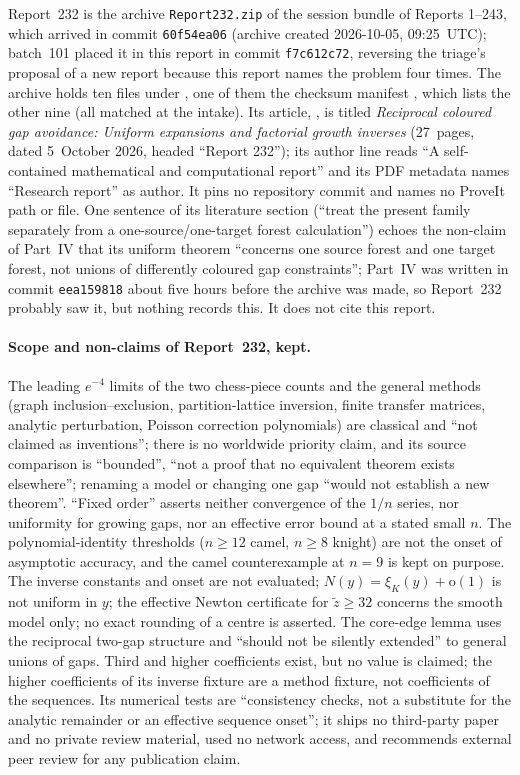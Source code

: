 \documentclass[11pt]{article}
\numberwithin{equation}{section}
\theoremstyle{definition}
\theoremstyle{remark}
\theoremstyle{definition}
\newcommand{\smallo}{\mathrm o}
\begin{document}
Report~232 is the archive \nolinkurl{Report232.zip} of the session bundle of
Reports 1--243, which arrived in commit \texttt{60f54ea06} (archive created
2026-10-05, 09:25~UTC); batch~101 placed it in this report in commit
\texttt{f7c612c72}, reversing the triage's proposal of a new report because
this report names the problem four times. The archive holds ten files under
, one of them the checksum manifest , which
lists the other nine (all matched at the intake). Its article,
, is titled \emph{Reciprocal coloured gap avoidance: Uniform
expansions and factorial growth inverses} (27~pages, dated 5~October 2026,
headed ``Report 232''); its author line reads ``A self-contained mathematical
and computational report'' and its PDF metadata names ``Research report'' as
author. It pins no repository commit and names no ProveIt path or file. One
sentence of its literature section (``treat the present family separately
from a one-source/one-target forest calculation'') echoes the non-claim of
Part~IV that its uniform theorem ``concerns one source forest and one target
forest, not unions of differently coloured gap constraints''; Part~IV was
written in commit \texttt{eea159818} about five hours before the archive was
made, so Report~232 probably saw it, but nothing records this. It does not
cite this report.

\paragraph{Scope and non-claims of Report~232, kept.}
The leading $e^{-4}$ limits of the two chess-piece counts and the general
methods (graph inclusion--exclusion, partition-lattice inversion, finite
transfer matrices, analytic perturbation, Poisson correction polynomials)
are classical and ``not claimed as inventions''; there is no worldwide
priority claim, and its source comparison is ``bounded'', ``not a proof that
no equivalent theorem exists elsewhere''; renaming a model or changing one
gap ``would not establish a new theorem''. ``Fixed order'' asserts neither
convergence of the $1/n$ series, nor uniformity for growing gaps, nor an
effective error bound at a stated small $n$. The polynomial-identity
thresholds ($n\ge12$ camel, $n\ge8$ knight) are not the onset of asymptotic
accuracy, and the camel counterexample at $n=9$ is kept on purpose. The
inverse constants and onset are not evaluated; $N(y)=\xi_K(y)+\smallo(1)$ is
not uniform in $y$; the effective Newton certificate for $\tilde z\ge32$
concerns the smooth model only; no exact rounding of a centre is asserted.
The core-edge lemma uses the reciprocal two-gap structure and ``should not be
silently extended'' to general unions of gaps. Third and higher coefficients
exist, but no value is claimed; the higher coefficients of its inverse
fixture are a method fixture, not coefficients of the sequences. Its
numerical tests are ``consistency checks, not a substitute for the analytic
remainder or an effective sequence onset''; it ships no third-party paper
and no private review material, used no network access, and recommends
external peer review for any publication claim.
\end{document}
